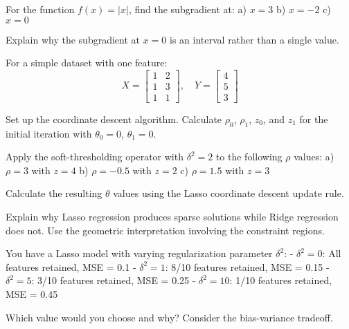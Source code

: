 \documentclass{article}
\newcounter{exercise}
\begin{document}
\begin{tcolorbox}[colback=gray!5!white,colframe=gray!75!black,title=Problem \stepcounter{exercise}: Subgradient Calculation]

For the function $f(x) = |x|$, find the subgradient at:
a) $x = 3$
b) $x = -2$ 
c) $x = 0$

Explain why the subgradient at $x = 0$ is an interval rather than a single value.
\end{tcolorbox}

\begin{tcolorbox}[colback=gray!5!white,colframe=gray!75!black,title=Problem \stepcounter{exercise}: Coordinate Descent Setup]

For a simple dataset with one feature:
$$X = \begin{bmatrix} 1 & 2 \\ 1 & 3 \\ 1 & 1 \end{bmatrix}, \quad Y = \begin{bmatrix} 4 \\ 5 \\ 3 \end{bmatrix}$$

Set up the coordinate descent algorithm. Calculate $\rho_0$, $\rho_1$, $z_0$, and $z_1$ for the initial iteration with $\theta_0 = 0$, $\theta_1 = 0$.
\end{tcolorbox}

\begin{tcolorbox}[colback=gray!5!white,colframe=gray!75!black,title=Problem \stepcounter{exercise}: Soft Thresholding]

Apply the soft-thresholding operator with $\delta^2 = 2$ to the following $\rho$ values:
a) $\rho = 3$ with $z = 4$
b) $\rho = -0.5$ with $z = 2$  
c) $\rho = 1.5$ with $z = 3$

Calculate the resulting $\theta$ values using the Lasso coordinate descent update rule.
\end{tcolorbox}

\begin{tcolorbox}[colback=gray!5!white,colframe=gray!75!black,title=Problem \stepcounter{exercise}: Sparsity Analysis]

Explain why Lasso regression produces sparse solutions while Ridge regression does not. Use the geometric interpretation involving the constraint regions.
\end{tcolorbox}

\begin{tcolorbox}[colback=gray!5!white,colframe=gray!75!black,title=Problem \stepcounter{exercise}: Regularization Parameter Selection]

You have a Lasso model with varying regularization parameter $\delta^2$:
- $\delta^2 = 0$: All features retained, MSE = 0.1
- $\delta^2 = 1$: 8/10 features retained, MSE = 0.15  
- $\delta^2 = 5$: 3/10 features retained, MSE = 0.25
- $\delta^2 = 10$: 1/10 features retained, MSE = 0.45

Which value would you choose and why? Consider the bias-variance tradeoff.
\end{tcolorbox}
\end{document}
